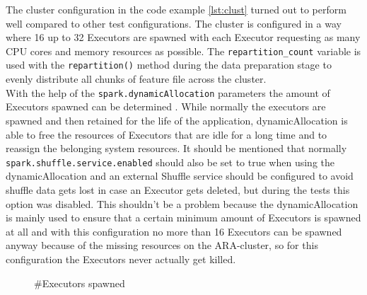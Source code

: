\noindent The cluster configuration in the code example \ref{lst:clust} turned out to perform well compared to other test configurations. The cluster is configured in a way where 16 up to 32 Executors are spawned with each Executor requesting as many CPU cores and memory resources as possible. The \lstinline{repartition_count} variable is used with the \lstinline{repartition()} method during the data preparation stage to evenly distribute all chunks of feature file across the cluster.\\
With the help of the \lstinline{spark.dynamicAllocation} parameters the amount of Executors spawned can be determined \cite[p. 153]{sparkbook1}. While normally the executors are spawned and then retained for the life of the application, dynamicAllocation is able to free the resources of Executors that are idle for a long time and to reassign the belonging system resources. 
It should be mentioned that normally \lstinline{spark.shuffle.service.enabled} should also be set to true when using the dynamicAllocation and an external Shuffle service should be configured to avoid shuffle data gets lost in case an Executor gets deleted, but during the tests this option was disabled. This shouldn't be a problem because the dynamicAllocation is mainly used to ensure that a certain minimum amount of Executors is spawned at all and with this configuration no more than 16 Executors can be spawned anyway because of the missing resources on the ARA-cluster, so for this configuration the Executors never actually get killed.\\

\FloatBarrier
\begin{figure}[htbp]
   	\centering
   	\caption{\#Executors spawned}
   	\label{perfspark7}
\end{figure}
\FloatBarrier

